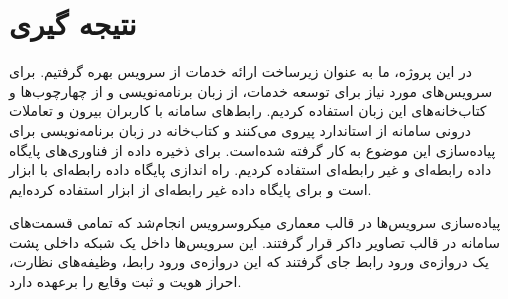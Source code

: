 \section{نتیجه گیری}

در این پروژه، ما به عنوان زیرساخت ارائه خدمات  از سرویس  بهره گرفتیم. برای سرویس‌های مورد نیاز برای توسعه خدمات، از زبان برنامه‌نویسی  و از چهارچوب‌ها و کتاب‌خانه‌های این زبان استفاده کردیم. رابط‌های سامانه با کاربران بیرون و تعاملات درونی سامانه از استاندارد  پیروی می‌کنند و کتاب‌خانه  در زبان برنامه‌نویسی  برای پیاده‌سازی این موضوع به کار گرفته شده‌است. برای ذخیره داده از فناوری‌های پایگاه داده رابطه‌ای و غیر رابطه‌ای استفاده کردیم. راه اندازی پایگاه داده رابطه‌ای با ابزار  است و برای پایگاه داده غیر رابطه‌ای از ابزار  استفاده کرده‌ایم.

پیاده‌سازی سرویس‌ها در قالب معماری میکروسرویس انجام‌شد که تمامی قسمت‌های سامانه در قالب تصاویر داکر قرار گرفتند. این سرویس‌ها داخل یک شبکه داخلی پشت یک ‌دروازه‌ی ورود رابط جای گرفتند که این ‌دروازه‌ی ورود رابط، وظیفه‌های نظارت، احراز هویت و ثبت وقایع را برعهده دارد.
